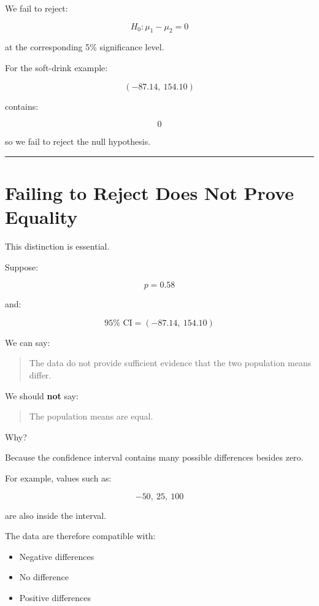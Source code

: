 \documentclass[
  letterpaper,
  DIV=11,
  numbers=noendperiod]{scrreprt}
\providecommand{\tightlist}{%
  \setlength{\itemsep}{0pt}\setlength{\parskip}{0pt}}
\begin{document}
We fail to reject:

\[
H_0:\mu_1-\mu_2=0
\]

at the corresponding 5\% significance level.

For the soft-drink example:

\[
(-87.14,\ 154.10)
\]

contains:

\[
0
\]

so we fail to reject the null hypothesis.

\begin{center}\rule{0.5\linewidth}{0.5pt}\end{center}


\chapter{Failing to Reject Does Not Prove
Equality}\label{failing-to-reject-does-not-prove-equality}

This distinction is essential.

Suppose:

\[
p=0.58
\]

and:

\[
95\%\text{ CI}
=
(-87.14,\ 154.10)
\]

We can say:

\begin{quote}
The data do not provide sufficient evidence that the two population
means differ.
\end{quote}

We should \textbf{not} say:

\begin{quote}
The population means are equal.
\end{quote}

Why?

Because the confidence interval contains many possible differences
besides zero.

For example, values such as:

\[
-50,\ 25,\ 100
\]

are also inside the interval.

The data are therefore compatible with:

\begin{itemize}
\tightlist
\item
  Negative differences
\item
  No difference
\item
  Positive differences
\end{itemize}
\end{document}
